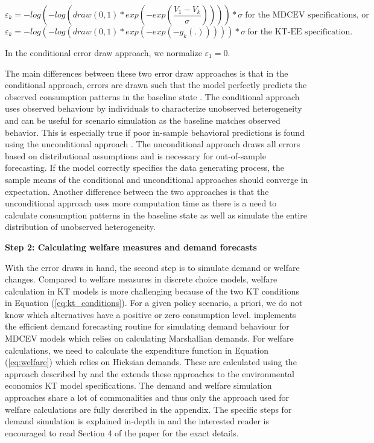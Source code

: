 \begin{equation}
\varepsilon_k = -log(-log(draw(0, 1) * exp(-exp(\frac{V_1 - V_k}{\sigma})))) * \sigma \; \mbox{for the MDCEV specifications, or}
\end{equation} \begin{equation}
\varepsilon_k = -log(-log(draw(0, 1) * exp(-exp(-g_k(.))))) * \sigma \: \mbox{for the KT-EE specification.}
\end{equation}

In the conditional error draw approach, we normalize
\(\varepsilon_1=0\).

The main differences between these two error draw approaches is that in
the conditional approach, errors are drawn such that the model perfectly
predicts the observed consumption patterns in the baseline state
\citep{vonhaefenkuhn-tucker2005}. The conditional approach uses observed
behaviour by individuals to characterize unobserved heterogeneity and
can be useful for scenario simulation as the baseline matches observed
behavior. This is especially true if poor in-sample behavioral
predictions is found using the unconditional approach
\citep{vonhaefenincorporating2003}. The unconditional approach draws all
errors based on distributional assumptions and is necessary for
out-of-sample forecasting. If the model correctly specifies the data
generating process, the sample means of the conditional and
unconditional approaches should converge in expectation. Another
difference between the two approaches is that the unconditional approach
uses more computation time as there is a need to calculate consumption
patterns in the baseline state as well as simulate the entire
distribution of unobserved heterogeneity.

\citep{vonhaefenincorporating2003}

\textbf{Step 2: Calculating welfare measures and demand forecasts}

With the error draws in hand, the second step is to simulate demand or
welfare changes. Compared to welfare measures in discrete choice models,
welfare calculation in KT models is more challenging because of the two
KT conditions in Equation (\ref{eq:kt_conditions}). For a given policy
scenario, a priori, we do not know which alternatives have a positive or
zero consumption level.  implements the
\citet{pinjaricomputationally2011} efficient demand forecasting routine
for simulating demand behaviour for MDCEV models which relies on
calculating Marshallian demands. For welfare calculations, we need to
calculate the expenditure function in Equation (\ref{eq:welfare}) which
relies on Hicksian demands. These are calculated using the approach
described by \citet{lloydsmithnew2018} and the  extends
these approaches to the environmental economics KT model specifications.
The demand and welfare simulation approaches share a lot of
commonalities and thus only the approach used for welfare calculations
are fully described in the appendix. The specific steps for demand
simulation is explained in-depth in \citet{pinjaricomputationally2011}
and the interested reader is encouraged to read Section 4 of the paper
for the exact details.

